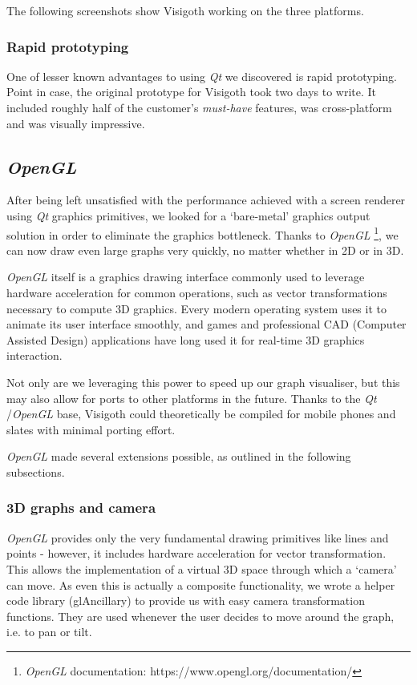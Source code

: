 \documentclass[a4paper,11pt,titlepage]{article}
\newcommand{\buzz}[1]{\emph{#1}}
\newcommand{\Qt}{\buzz{Qt} }
\newcommand{\OpenGL}{\buzz{OpenGL} }
\begin{document}
The following screenshots show Visigoth working on the three
platforms.

\subsubsection{Rapid prototyping}

One of lesser known advantages to using \Qt we discovered is rapid
prototyping. Point in case, the original prototype for Visigoth took
two days to write. It included roughly half of the customer's
\emph{must-have} features, was cross-platform and was visually
impressive.

\subsection{\OpenGL}
\label{opengl}

After being left unsatisfied with the performance achieved with a
screen renderer using \Qt graphics primitives, we looked for a
`bare-metal' graphics output solution in order to eliminate the
graphics bottleneck. Thanks to \OpenGL \footnote{\OpenGL
  documentation: https://www.opengl.org/documentation/}, we can now
draw even large graphs very quickly, no matter whether in 2D or in 3D.

\OpenGL itself is a graphics drawing interface commonly used to
leverage hardware acceleration for common operations, such as vector
transformations necessary to compute 3D graphics. Every modern
operating system uses it to animate its user interface smoothly, and
games and professional CAD (Computer Assisted Design) applications
have long used it for real-time 3D graphics interaction.

Not only are we leveraging this power to speed up our graph
visualiser, but this may also allow for ports to other
platforms in the future. Thanks to the \Qt/\OpenGL base, Visigoth
could theoretically be compiled for mobile phones and slates
with minimal porting effort.

\OpenGL made several extensions possible, as outlined in the following
subsections.

\subsubsection{3D graphs and camera}
\OpenGL provides only the very fundamental drawing primitives like
lines and points - however, it includes hardware acceleration for
vector transformation. This allows the implementation of a virtual 3D
space through which a `camera' can move. As even this is actually a
composite functionality, we wrote a helper code library (glAncillary)
to provide us with easy camera transformation functions. They are used
whenever the user decides to move around the graph, i.e. to pan or
tilt.
\end{document}
